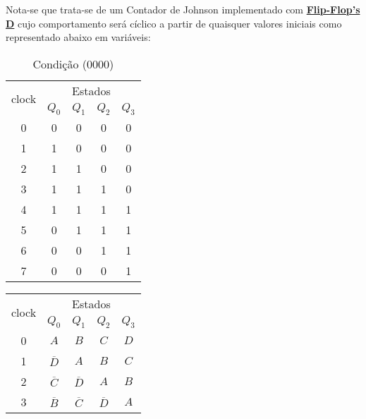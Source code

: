 \documentclass{article}
\begin{document}
    \begin{resolution}
        Nota-se que trata-se de um Contador de Johnson implementado com \href{https://en.wikipedia.org/wiki/Flip-flop_(electronics)}{\textbf{Flip-Flop's D}} cujo comportamento será cíclico a partir de quaisquer valores iniciais como representado abaixo em variáveis:
        \begin{center}
            \begin{minipage}{0.45\linewidth}
            \begin{table}[H]
                \centering\begin{tabular}[]{c|cccc}\hline
                \multirow{2}{*}{clock} & \multicolumn{4}{c}{Estados}\\
                                        & $Q_0$ & $Q_1$ & $Q_2$ & $Q_3$\\\hline
                0 & 0 & 0 & 0 & 0\\
                1 & 1 & 0 & 0 & 0\\
                2 & 1 & 1 & 0 & 0\\
                3 & 1 & 1 & 1 & 0\\
                4 & 1 & 1 & 1 & 1\\
                5 & 0 & 1 & 1 & 1\\
                6 & 0 & 0 & 1 & 1\\
                7 & 0 & 0 & 0 & 1\\\hline
            \end{tabular}\caption{Condição (0000)}
            \end{table}
        \end{minipage}
        \begin{minipage}{0.45\linewidth}
            \begin{table}[H]
                \centering\begin{tabular}[]{c|cccc}\hline
                \multirow{2}{*}{clock} & \multicolumn{4}{c}{Estados}\\
                                        & $Q_0$ & $Q_1$ & $Q_2$ & $Q_3$\\\hline
                0 & $A$            & $B$            & $C$            & $D$\\
                1 & $\overline{D}$ & $A$            & $B$            & $C$\\
                2 & $\overline{C}$ & $\overline{D}$ & $A$            & $B$\\
                3 & $\overline{B}$ & $\overline{C}$ & $\overline{D}$ & $A$\\

\end{tabular}
\end{table}
\end{minipage}
\end{center}
\end{resolution}
\end{document}
